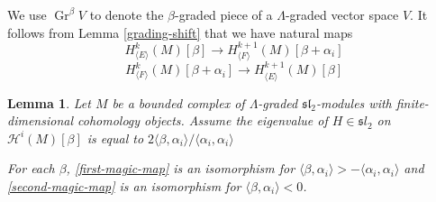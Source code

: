 \documentclass[11pt,letterpaper]{article}
\newtheorem{lemma}[theorem]{Lemma}
\theoremstyle{definition}
\theoremstyle{remark}
\numberwithin{equation}{section}
\theoremstyle{dotless}
\newcommand{\Gr}{\operatorname{Gr}}
\newcommand{\LieH}{H}
\begin{document}
We use $\Gr^\beta V$ to denote the $\beta$-graded piece of a $\Lambda$-graded vector space $V$. It follows from Lemma \ref{grading-shift} that we have natural maps
\begin{equation}\label{first-magic-map}  \LieH^{k}_{\langle E \rangle} ( M) [\beta] \to   \LieH^{k+1}_{\langle F \rangle} ( M) [\beta+\alpha_i]  \end{equation}
\begin{equation}\label{second-magic-map}  \LieH^{k}_{\langle F \rangle} ( M)[\beta+ \alpha_i]  \to   \LieH^{k+1}_{\langle E \rangle} ( M) [\beta] \end{equation}
\begin{lemma}\label{sl2-isos} Let $M$ be a bounded complex of $\Lambda$-graded $\mathfrak{sl}_2$-modules with finite-dimensional cohomology objects. Assume the eigenvalue of $H\in \mathfrak sl_2$ on $\mathcal H^{i} (M)[\beta]$ is equal to $2\langle \beta, \alpha_i \rangle / \langle \alpha_i, \alpha_i \rangle $


For each $\beta$, \eqref{first-magic-map}  is an isomorphism for $\langle \beta, \alpha_i  \rangle > - \langle \alpha_i, \alpha_i \rangle $ and \eqref{second-magic-map} is an isomorphism for $\langle \beta, \alpha_i \rangle < 0$. \end{lemma} 
\end{document}
